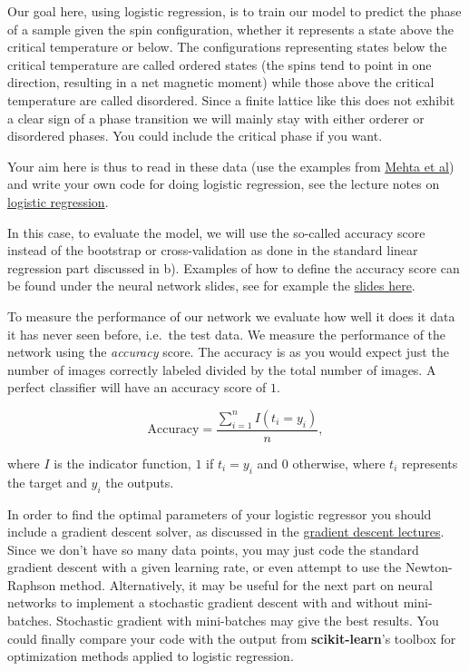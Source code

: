 \documentclass[%
oneside,                 %
final,                   %
10pt]{article}
\begin{document}
Our goal here, using logistic regression, is to train our model to
predict the phase of a sample given the spin configuration, whether it
represents a state above the critical temperature or below.  The
configurations representing states below the critical temperature are
called ordered states (the spins tend to point in one direction,
resulting in a net magnetic moment) while those above the critical
temperature are called disordered. Since a finite lattice like this
does not exhibit a clear sign of a phase transition we will mainly
stay with either orderer or disordered phases. You could include the
critical phase if you want.


Your aim here is thus to read in these data (use the examples from
\href{{https://physics.bu.edu/~pankajm/ML-Notebooks/HTML/NB_CVII-logreg_ising.html}}{Mehta et
al})
and write your own code for doing logistic regression, see the lecture
notes on \href{{https://compphysics.github.io/MachineLearning/doc/pub/LogReg/html/LogReg-bs.html}}{logistic
regression}.


In this case, to evaluate the model, we will use the so-called accuracy score 
instead of the bootstrap or cross-validation as done in the standard linear regression part discussed in b).  Examples of how to define the accuracy score can be found under the neural network slides, see for example the \href{{https://compphysics.github.io/MachineLearning/doc/pub/NeuralNet/html/._NeuralNet-bs047.html}}{slides here}.

To measure the performance of our network we evaluate how well it does
it data it has never seen before, i.e.~the test data.  We measure the
performance of the network using the \emph{accuracy} score.  The accuracy
is as you would expect just the number of images correctly labeled
divided by the total number of images. A perfect classifier will have
an accuracy score of $1$.

\[ 
\text{Accuracy} = \frac{\sum_{i=1}^n I(t_i = y_i)}{n} ,
\]

where $I$ is the indicator function, $1$ if $t_i = y_i$ and $0$
otherwise, where $t_i$ represents the target and $y_i$ the outputs.



In order to find the optimal parameters of your logistic regressor you should
include a gradient descent solver, as discussed in the \href{{https://compphysics.github.io/MachineLearning/doc/pub/Splines/html/Splines-bs.html}}{gradient
descent
lectures}.
Since we don't have so many data points, you may just code the
standard gradient descent with a given learning rate, or even attempt
to use the Newton-Raphson method.  Alternatively, it may be useful for
the next part on neural networks to implement a stochastic gradient
descent with and without mini-batches. Stochastic gradient with mini-batches may give the best results. You could finally compare your code with the output from \textbf{scikit-learn}'s toolbox for
optimization methods applied to logistic regression.
\end{document}
